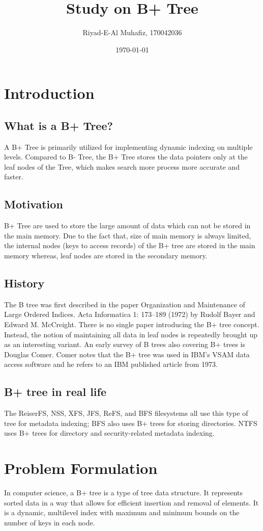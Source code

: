 \documentclass[11pt, a4paper]{article}
\title{Study on B+ Tree}
\author{Riyad-E-Al Muhafiz, 170042036 }
\date{\today}
\begin{document}
\maketitle
\section{Introduction}
\subsection{What is a B+ Tree?}
A B+ Tree is primarily utilized for implementing dynamic indexing on multiple levels. Compared to B- Tree, the B+ Tree stores the data pointers only at the leaf nodes of the Tree, which makes search more process more accurate and faster.
\subsection{Motivation}
\noindent B+ Tree are used to store the large amount of data which can not be stored in the main memory. Due to the fact that, size of main memory is always limited, the internal nodes (keys to access records) of the B+ tree are stored in the main memory whereas, leaf nodes are stored in the secondary memory.
\subsection{History}
\noindent The B tree was first described in the paper Organization and Maintenance of Large Ordered Indices. Acta Informatica 1: 173–189 (1972) by Rudolf Bayer and Edward M. McCreight. There is no single paper introducing the B+ tree concept. Instead, the notion of maintaining all data in leaf nodes is repeatedly brought up as an interesting variant. An early survey of B trees also covering B+ trees is Douglas Comer. Comer notes that the B+ tree was used in IBM's VSAM data access software and he refers to an IBM published article from 1973.
\subsection{B+ tree in real life}
The ReiserFS, NSS, XFS, JFS, ReFS, and BFS filesystems all use this type of tree for metadata indexing; BFS also uses B+ trees for storing directories. NTFS uses B+ trees for directory and security-related metadata indexing.
\section{Problem Formulation}
\noindent In computer science, a B+ tree is a type of tree data structure. It represents sorted data in a way that allows for efficient insertion and removal of elements. It is a dynamic, multilevel index with maximum and minimum bounds on the number of keys in each node. \vspace{0.5cm}
\end{document}
